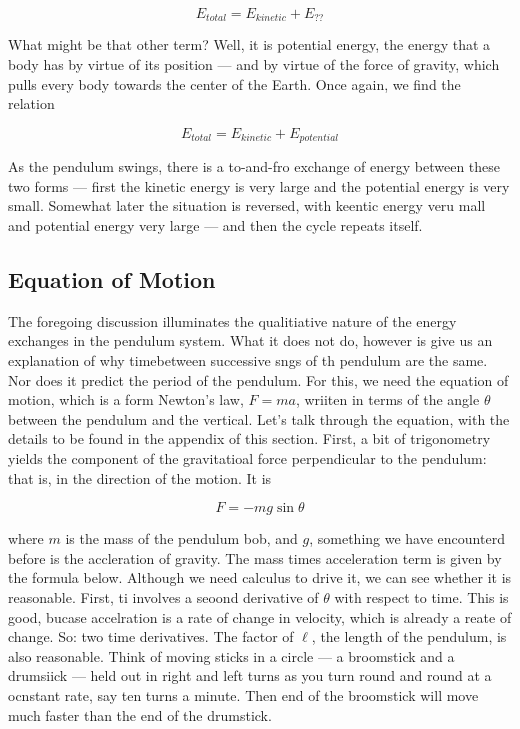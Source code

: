 $$
E_{total} = E_{kinetic} + E_{??}
$$

What might be that other term?  Well, it is potential energy, the energy that a body has by virtue of its position — and by virtue of the force of gravity, which pulls every body towards the center of the Earth.  Once again, we find the relation 

$$
E_{total} = E_{kinetic} + E_{potential}
$$

As the pendulum swings, there is a to-and-fro exchange of energy between these two forms — first the kinetic energy is very large and the potential energy is very small.  Somewhat later the situation is reversed, with keentic energy veru mall and potential energy very large — and then the cycle repeats itself.

\subsection{Equation of Motion}


The foregoing discussion illuminates the qualitiative nature of the energy exchanges in the pendulum system.  What it does not do, however is give us an explanation of why timebetween successive sngs of th pendulum are the same.  Nor does it predict the period of the pendulum.   For this, we need the equation of motion, which  is a form Newton's law, $F = ma$, wriiten in terms of the angle $\theta$ between the pendulum and the vertical.  Let's talk through the equation, with the details to be found in the appendix of this section.  First, a bit of trigonometry yields the component of the gravitatioal force perpendicular to the pendulum: that is, in the direction of the motion.  It is

$$
  F = - mg \sin\theta
$$

where $m$ is the mass of the pendulum bob, and $g$, something we have encounterd before is the accleration of gravity.  The mass times acceleration term is given by the formula below. Although we need calculus to drive it, we can see whether it is reasonable.  First, ti involves a seoond derivative of $\theta$ with respect to time.  This is good, bucase accelration is a rate of change in velocity, which is already a reate of change.  So: two time derivatives.  The factor of $\ell$, the length of the pendulum, is also reasonable.  Think of moving sticks in a circle — a broomstick and a drumsiick — held out in right and left turns as you turn round and round at a ocnstant rate, say ten turns a minute.  Then end of the broomstick will move much faster than the end of the drumstick.

